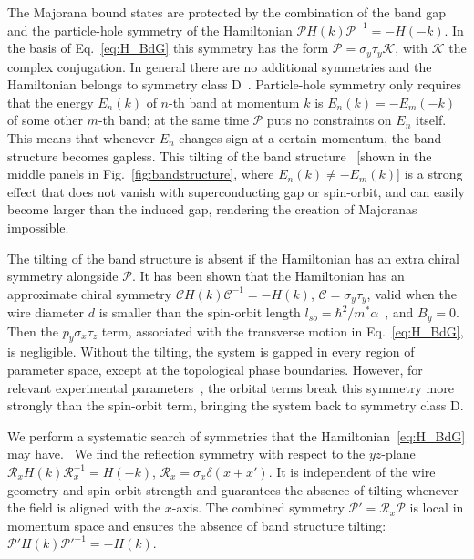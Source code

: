 The Majorana bound states are protected by the combination of the band gap and the particle-hole symmetry of the Hamiltonian $\mathcal{P}H\left(k\right)\mathcal{P}^{-1}=-H\left(-k\right)$.
In the basis of Eq.~\eqref{eq:H_BdG} this symmetry has the form $\mathcal{P}=\sigma_y \tau_y\mathcal{K}$, with $\mathcal{K}$ the complex conjugation.
In general there are no additional symmetries and the Hamiltonian belongs to symmetry class D~\cite{Altland1997}.
Particle-hole symmetry only requires that the energy $E_n(k)$ of $n$-th band at momentum $k$ is $E_n(k)=-E_m(-k)$ of some other $m$-th band; at the same time $\mathcal{P}$ puts no constraints on $E_n$ itself.
This means that whenever $E_{n}$ changes sign at a certain momentum, the band structure becomes gapless.
This tilting of the band structure~\cite{Rex2014} [shown in the middle panels in Fig.~\ref{fig:bandstructure}, where $E_n(k) \ne -E_m(k)$] is a strong effect that does not vanish with superconducting gap or spin-orbit, and can easily become larger than the induced gap, rendering the creation of Majoranas impossible.


The tilting of the band structure is absent if the Hamiltonian has an extra chiral symmetry alongside $\mathcal{P}$.
It has been shown that the Hamiltonian has an approximate chiral symmetry $\mathcal{C}H\left(k\right)\mathcal{C}^{-1}=-H\left(k\right)$, $\mathcal{C}=\sigma_y \tau_y$, valid when the wire diameter $d$ is smaller than the spin-orbit length $l_{so}=\hbar^{2}/m^{*}\alpha$~\cite{Tewari2012,Diez2012}, and $B_y=0$.
Then the $p_{y}\sigma_x \tau_z$ term, associated with the transverse motion in Eq.~\eqref{eq:H_BdG}, is negligible.
Without the tilting, the system is gapped in every region of parameter space, except at the topological phase boundaries.
However, for relevant experimental parameters~\cite{Mourik2012}, the orbital terms break this symmetry more strongly than the spin-orbit term, bringing the system back to symmetry class D.


We perform a systematic search of symmetries that the Hamiltonian~\eqref{eq:H_BdG} may have.~\cite{Varjas2018}
We find the reflection symmetry with respect to the $yz$-plane $\mathcal{R}_x H\left(k\right)\mathcal{R}_x^{-1}=H\left(-k\right)$, $\mathcal{R}_x=\sigma_x\delta(x+x')$.
It is independent of the wire geometry and spin-orbit strength and guarantees the absence of tilting whenever the field is aligned with the $x$-axis.
The combined symmetry $\mathcal{P}' = \mathcal{R}_x \mathcal{P}$ is local in momentum space and ensures the absence of band structure tilting: $\mathcal{P}' H(k) \mathcal{P}'^{-1} = -H(k)$.

